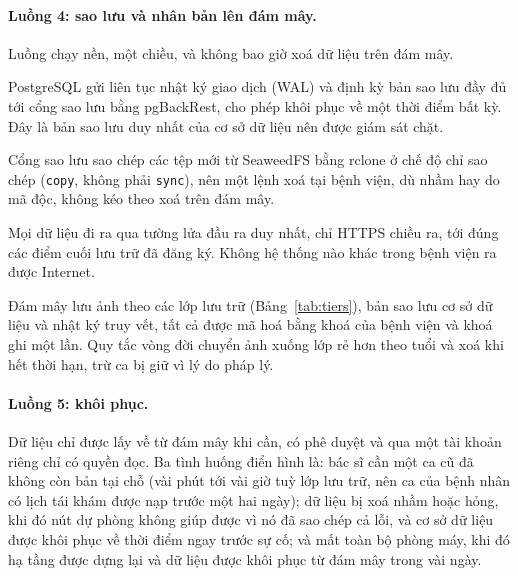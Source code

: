 \paragraph{Luồng 4: sao lưu và nhân bản lên đám mây.} Luồng chạy nền, một chiều, và
không bao giờ xoá dữ liệu trên đám mây.
\begin{description}[leftmargin=1.2cm,style=nextline]
\item[4.1] PostgreSQL gửi liên tục nhật ký giao dịch (WAL) và định kỳ bản sao lưu đầy
      đủ tới cổng sao lưu bằng pgBackRest, cho phép khôi phục về một thời điểm bất kỳ.
      Đây là bản sao lưu duy nhất của cơ sở dữ liệu nên được giám sát chặt.
\item[4.2] Cổng sao lưu sao chép các tệp mới từ SeaweedFS bằng rclone ở chế độ chỉ sao
      chép (\texttt{copy}, không phải \texttt{sync}), nên một lệnh xoá tại bệnh viện,
      dù nhầm hay do mã độc, không kéo theo xoá trên đám mây.
\item[4.3] Mọi dữ liệu đi ra qua tường lửa đầu ra duy nhất, chỉ HTTPS chiều ra, tới
      đúng các điểm cuối lưu trữ đã đăng ký. Không hệ thống nào khác trong bệnh viện ra
      được Internet.
\item[4.4] Đám mây lưu ảnh theo các lớp lưu trữ (Bảng~\ref{tab:tiers}), bản sao lưu cơ
      sở dữ liệu và nhật ký truy vết, tất cả được mã hoá bằng khoá của bệnh viện và khoá
      ghi một lần. Quy tắc vòng đời chuyển ảnh xuống lớp rẻ hơn theo tuổi và xoá khi hết
      thời hạn, trừ ca bị giữ vì lý do pháp lý.
\end{description}

\paragraph{Luồng 5: khôi phục.} Dữ liệu chỉ được lấy về từ đám mây khi cần, có phê
duyệt và qua một tài khoản riêng chỉ có quyền đọc. Ba tình huống điển hình là: bác sĩ cần
một ca cũ đã không còn bản tại chỗ (vài phút tới vài giờ tuỳ lớp lưu trữ, nên ca của bệnh
nhân có lịch tái khám được nạp trước một hai ngày); dữ liệu bị xoá nhầm hoặc hỏng, khi đó
nút dự phòng không giúp được vì nó đã sao chép cả lỗi, và cơ sở dữ liệu được khôi phục về
thời điểm ngay trước sự cố; và mất toàn bộ phòng máy, khi đó hạ tầng được dựng lại và dữ
liệu được khôi phục từ đám mây trong vài ngày.


